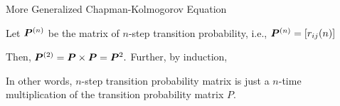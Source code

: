 \begin{frame}{More Generalized Chapman-Kolmogorov Equation}


\plitemsep 0.1in

\bci 

\item {}

\item<7-> Let $\bm{P}^{(n)}$ be the matrix of $n$-step transition
  probability, i.e., $\bm{P}^{(n)} = [r_{ij}(n)]$

\item<8->  Then, $\bm{P}^{(2)}= \bm{P} \times \bm{P} = \bm{P}^2.$
  Further, by induction, 

\item<9-> In other words, $n$-step transition probability matrix is just a
  $n$-time multiplication of the transition probability matrix $P.$
  \eci 

\end{frame}


